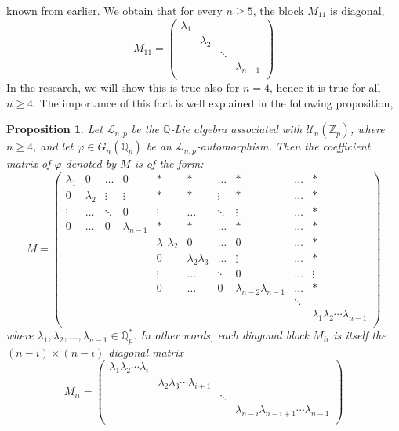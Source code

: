 \documentclass[12pt]{article}
\newtheorem{proposition}[theorem]{Proposition}
\begin{document}
known from earlier. We obtain that for every $n\geq 5$, the block $M_{11}$ is diagonal,
\[M_{11}=\begin{pmatrix}
\lambda_1 & & &\\
& \lambda_2 & &\\
& & \ddots &\\
& & & \lambda_{n-1}\\
\end{pmatrix}
\]
In the research, we will show this is true also for $n=4$, hence it is true for all $n\geq 4$. The importance of this fact is well explained in the following proposition,
\begin{proposition}
\label{prop.main.diagonal.blocks}
Let $\mathcal{L}_{n,p}$ be the $\mathbb{Q}$-Lie algebra associated with $\mathcal{U}_n(\mathbb{Z}_p)$, where $n\geq 4$, and let $\varphi\in G_n(\mathbb{Q}_p)$ be an $\mathcal{L}_{n,p}$-automorphism. Then the coefficient matrix of $\varphi$ denoted by $M$ is of the form:
\[M=\begin{pmatrix}
\lambda_1 & 0 & \dots & 0 & * & * & \dots & *& \dots & *\\
0 & \lambda_2 & \vdots & \vdots & * & * & \vdots & * & \dots & *\\
\vdots & \dots & \ddots & 0 & \vdots & \dots & \ddots & \vdots & \dots & *\\
0 & \dots & 0 & \lambda_{n-1} & * & * & \dots & * & \dots & *\\
& & & & \lambda_1\lambda_2 & 0 & \dots & 0 & \dots & *\\
& & & & 0 & \lambda_2\lambda_3 & \dots & \vdots & \dots & *\\
& & & & \vdots & \dots & \ddots & 0 & \dots & \vdots\\
& & & & 0 & \dots & 0 & \lambda_{n-2}\lambda_{n-1} & \dots & *\\
& & & & & & & & \ddots &\\
& & & & & & & & & \lambda_1\lambda_2\cdots\lambda_{n-1}\\
\end{pmatrix}
\]
where $\lambda_1,\lambda_2,\dots,\lambda_{n-1}\in\mathbb{Q}_p^*$. In other words, each diagonal block $M_{ii}$ is itself the $(n-i)\times(n-i)$ diagonal matrix
\[M_{ii}=\begin{pmatrix}
\lambda_1\lambda_2\cdots\lambda_i & & &\\
& \lambda_2\lambda_3\cdots\lambda_{i+1} & &\\
& & \ddots &\\
& & & \lambda_{n-i}\lambda_{n-i+1}\cdots\lambda_{n-1}\\
\end{pmatrix}
\]
\end{proposition}
\end{document}
